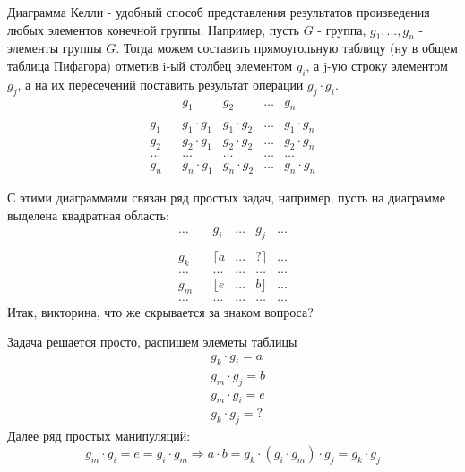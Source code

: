 \begin{Def}
	Диаграмма Келли - удобный способ представления результатов произведения любых элементов конечной группы. Например, пусть $G$ - группа, $g_1, ... , g_n$ - элементы группы $G$. Тогда можем составить прямоугольную таблицу (ну в общем таблица Пифагора) отметив i-ый столбец элементом $g_i$, а j-ую строку элементом $g_j$, а на их пересечений поставить результат операции $g_j \cdot g_i$.
	\[
		\begin{matrix}
			      && g_1             & g_2             & \dots & g_n             \\ \\
			g_1   && g_1 \cdot g_1   & g_1 \cdot g_2   & \dots & g_1 \cdot g_n   \\
			g_2   && g_2 \cdot g_1   & g_2 \cdot g_2   & \dots & g_2 \cdot g_n   \\
			\dots && \dots           & \dots           & \dots & \dots           \\
			g_n   && g_n \cdot g_1   & g_n \cdot g_2   & \dots & g_n \cdot g_n			
		\end{matrix}
	\]
\end{Def}

С этими диаграммами связан ряд простых задач, например, пусть на диаграмме выделена квадратная область:
\[
	\begin{matrix}
		\dots && g_i   & \dots & g_j      & \dots \\ \\
		g_k   && \lceil a     & \dots & \text{?} \rceil & \dots \\
		\dots && \dots & \dots & \dots    & \dots \\
		g_m   && \lfloor e     & \dots & b \rfloor        & \dots \\
		\dots && \dots & \dots & \dots    & \dots
	\end{matrix}
\]
Итак, викторина, что же скрывается за знаком вопроса? 

\begin{Solution}
Задача решается просто, распишем элеметы таблицы
\[
	\begin{split}
		& g_k \cdot g_i = a \\
		& g_m \cdot g_j = b \\
		& g_m \cdot g_i = e \\
		& g_k \cdot g_j = ?
	\end{split}
\]
Далее ряд простых манипуляций:
\[
	g_m \cdot g_i = e = g_i \cdot g_m \Rightarrow a \cdot b = g_k \cdot \left( g_i \cdot g_m \right) \cdot g_j = g_k \cdot g_j
\]
\end{Solution}
